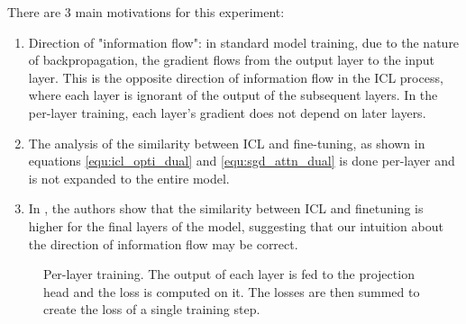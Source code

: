 \documentclass[11pt]{article}
\begin{document}
There are 3 main motivations for this experiment:
\begin{enumerate}
	\item Direction of "information flow": in standard model training, due to the nature of backpropagation, the gradient flows from the output layer to the input layer.
	      This is the opposite direction of information flow in the ICL process, where each layer is ignorant of the output of the subsequent layers.
	      In the per-layer training, each layer's gradient does not depend on later layers.
	\item The analysis of the similarity between ICL and fine-tuning, as shown in equations \ref{equ:icl_opti_dual} and \ref{equ:sgd_attn_dual} is done per-layer and is not expanded to the entire model.
	\item In \cite{dai2023gpt}, the authors show that the similarity between ICL and finetuning is higher for the final layers of the model, suggesting that our intuition about the direction of information flow may be correct.
\end{enumerate}

\begin{figure}%
	\centering
	\caption{Per-layer training. The output of each layer is fed to the projection head and the loss is computed on it. The losses are then summed to create the loss of a single training step.}
	\label{per-layer-training}
\end{figure}

\end{document}
